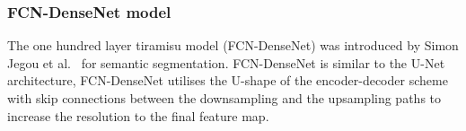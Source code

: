 \subsubsection{FCN-DenseNet model}
The one hundred layer tiramisu model (FCN-DenseNet) was introduced by Simon Jegou et al.~\cite{Jegou} for semantic segmentation.
FCN-DenseNet is similar to the U-Net architecture, FCN-DenseNet utilises the U-shape of the encoder-decoder scheme with skip connections between the downsampling and the upsampling paths to increase the resolution to the final feature map.

